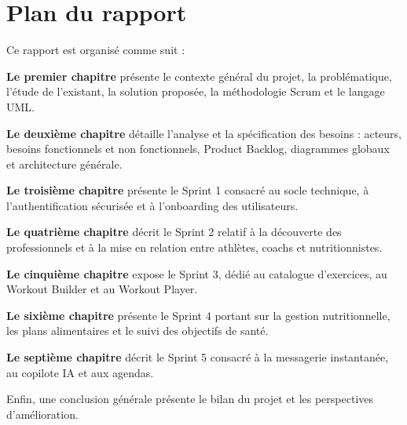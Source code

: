 \section*{Plan du rapport}
Ce rapport est organisé comme suit :

\textbf{Le premier chapitre} présente le contexte général du projet, la problématique, l'étude de l'existant, la solution proposée, la méthodologie Scrum et le langage UML.

\textbf{Le deuxième chapitre} détaille l'analyse et la spécification des besoins : acteurs, besoins fonctionnels et non fonctionnels, Product Backlog, diagrammes globaux et architecture générale.

\textbf{Le troisième chapitre} présente le Sprint 1 consacré au socle technique, à l'authentification sécurisée et à l'onboarding des utilisateurs.

\textbf{Le quatrième chapitre} décrit le Sprint 2 relatif à la découverte des professionnels et à la mise en relation entre athlètes, coachs et nutritionnistes.

\textbf{Le cinquième chapitre} expose le Sprint 3, dédié au catalogue d'exercices, au Workout Builder et au Workout Player.

\textbf{Le sixième chapitre} présente le Sprint 4 portant sur la gestion nutritionnelle, les plans alimentaires et le suivi des objectifs de santé.

\textbf{Le septième chapitre} décrit le Sprint 5 consacré à la messagerie instantanée, au copilote IA et aux agendas.


Enfin, une conclusion générale présente le bilan du projet et les perspectives d'amélioration.
